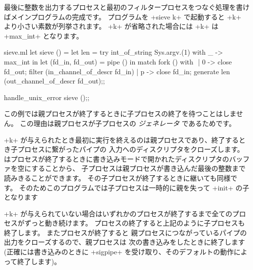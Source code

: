 最後に整数を出力するプロセスと最初のフィルタープロセスをつなぐ処理を書けばメインプログラムの完成です。
プログラムを \ml+sieve k+ で起動すると \ml+k+ より小さい素数が列挙されます。
\ml+k+ が省略された場合には \ml+k+ は \ml+max_int+ となります。
%
\begin{listingcodefile}[style=numbers]{sieve.ml}
let sieve () =
  let len = try int_of_string Sys.argv.(1) with _ -> max_int in
  let (fd_in, fd_out) = pipe () in
  match fork () with $\label{prog:sievefork}$
  | 0 ->
      close fd_out;
      filter (in_channel_of_descr fd_in)
  | p ->
      close fd_in;
      generate len (out_channel_of_descr fd_out);; $\label{prog:gen}$

handle_unix_error sieve ();;
\end{listingcodefile}
%

この例では親プロセスが終了するときに子プロセスの終了を待つことはしません。
この理由は親プロセスが子プロセスの \emph{ジェネレータ} であるためです。

\ml+k+ が与えられたとき最初に実行を終えるのは親プロセスであり、終了するとき子プロセスに繋がったパイプの
入力へのディスクリプタをクローズします。
\ocaml はプロセスが終了するときに書き込みモードで開かれたディスクリプタのバッファを空にすることから、
子プロセスは親プロセスが書き込んだ最後の整数まで読みきることができます。
その子プロセスが終了するときに継いても同様です。
そのためこのプログラムでは子プロセスは一時的に親を失って \ml+init+ の子となります

\ml+k+ が与えられていない場合はいずれかのプロセスが終了するまで全てのプロセスがずっと動き続けます。
プロセスの終了すると上記のように子プロセスも終了します。
またプロセスが終了すると
親プロセスにつながっているパイプの出力をクローズするので、親プロセスは
次の書き込みをしたときに終了します (正確には書き込みのときに \ml+sigpipe+ を受け取り、そのデフォルトの動作によって終了します)。


